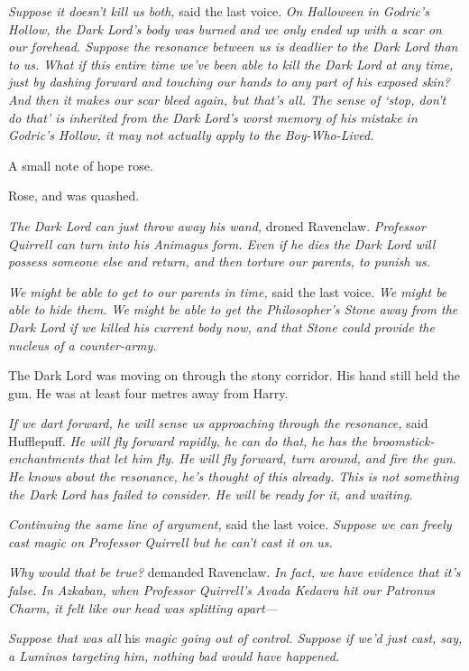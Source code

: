 \emph{Suppose it doesn't kill us both,} said the last voice. \emph{On Halloween
in Godric's Hollow, the Dark Lord's body was burned and we only ended up with a
scar on our forehead. Suppose the resonance between us is deadlier to the Dark
Lord than to us. What if this entire time we've been able to kill the Dark Lord
at any time, just by dashing forward and touching our hands to any part of his
exposed skin? And then it makes our scar bleed again, but that's all. The sense
of `stop, don't do that' is inherited from the Dark Lord's worst memory of his
mistake in Godric's Hollow, it may not actually apply to the Boy-Who-Lived.}

A small note of hope rose.

Rose, and was quashed.

\emph{The Dark Lord can just throw away his wand,} droned Ravenclaw.
\emph{Professor Quirrell can turn into his Animagus form. Even if he dies the
Dark Lord will possess someone else and return, and then torture our parents,
to punish us.}

\emph{We might be able to get to our parents in time,} said the last voice.
\emph{We might be able to hide them. We might be able to get the Philosopher's
Stone away from the Dark Lord if we killed his current body now, and that Stone
could provide the nucleus of a counter-army.}

The Dark Lord was moving on through the stony corridor. His hand still held the
gun. He was at least four metres away from Harry.

\emph{If we dart forward, he will sense us approaching through the resonance,}
said Hufflepuff. \emph{He will fly forward rapidly, he can do that, he has the
broomstick-enchantments that let him fly. He will fly forward, turn around, and
fire the gun. He knows about the resonance, he's thought of this already. This
is not something the Dark Lord has failed to consider. He will be ready for it,
and waiting.}

\emph{Continuing the same line of argument,} said the last voice. \emph{Suppose
we can freely cast magic on Professor Quirrell but he can't cast it on us.}

\emph{Why would that be true?} demanded Ravenclaw. \emph{In fact, we have
evidence that it's false. In Azkaban, when Professor Quirrell's Avada Kedavra
hit our Patronus Charm, it felt like our head was splitting apart---}

\emph{Suppose that was all} his \emph{magic going out of control. Suppose if
we'd just cast, say, a Luminos targeting him, nothing bad would have happened.}

